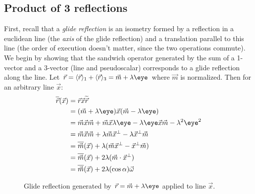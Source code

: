 \documentclass{birkjour}
\begin{document}
{\subsection{Product of 3 reflections}
First, recall that a \emph{glide reflection} is an isometry formed by a reflection in a euclidean line (the \emph{axis} of the glide reflection) and a translation parallel to this line (the order of execution doesn't matter, since the two operations commute).
We begin by showing that the sandwich operator generated by the sum of a 1-vector and a 3-vector (line and pseudoscalar) corresponds to a glide reflection along the line.  Let $\vec{r} = \langle \vec{r} \rangle_{1} + \langle \vec{r} \rangle_{3} =\vec{m}  + \lambda \eye$ where $\vec{m}$ is normalized. Then for an arbitrary line $\vec{x}$:
\begin{align*}
\overline{\vec{r}}(\vec{x}) &= \vec{r} \vec{x} \widetilde{\vec{r}} \\
&= (\vec{m} + \lambda \eye) \vec{x} (\vec{m} - \lambda \eye) \\
&= \vec{m} \vec{x} \vec{m} + \vec{m}\vec{x}\lambda \eye - \lambda \eye \vec{x} \vec{m} - \lambda^{2}\eye^{2}\\
&= \vec{m} \vec{x} \vec{m} + \lambda \vec{m} \vec{x}^{\perp} - \lambda \vec{x}^{\perp} \vec{m} \\
&= \overline{ \vec{m}}(\vec{x}) + \lambda(\vec{m}\vec{x}^{\perp} - \vec{x}^{\perp}\vec{m})\\
&= \overline{ \vec{m}}(\vec{x}) + 2 \lambda(\vec{m} \cdot \vec{x}^{\perp}) \\
&=  \overline{ \vec{m}}(\vec{x})  + 2 \lambda (\cos{\alpha})\vec{\omega} 
\end{align*}
\begin{figure}
  \centering
    \setlength\fboxsep{0pt}
  \caption{Glide reflection generated by $\vec{r} = \vec{m} + \lambda \eye$ applied to line $\vec{x}$.}

\end{figure}}
\end{document}
